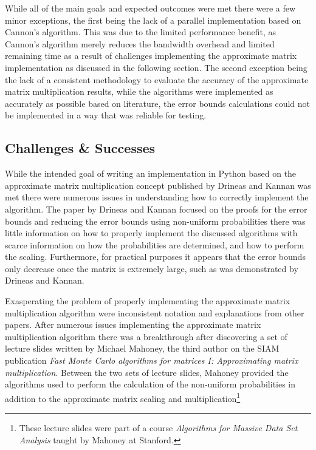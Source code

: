 \documentclass[oneside]{article}
\begin{document}
While all of the main goals and expected outcomes were met there were a few minor exceptions, the first being the lack of a parallel implementation based on Cannon's algorithm. This was due to the limited performance benefit, as Cannon's algorithm merely reduces the bandwidth overhead\cite{lee1997generalized} and limited remaining time as a result of challenges implementing the approximate matrix implementation as discussed in the following section. The second exception being the lack of a consistent methodology to evaluate the accuracy of the approximate matrix multiplication results, while the algorithms were implemented as accurately as possible based on literature, the error bounds calculations could not be implemented in a way that was reliable for testing.




\subsection{Challenges \& Successes}


While the intended goal of writing an implementation in Python based on the approximate matrix multiplication concept published by Drineas and Kannan was met there were numerous issues in understanding how to correctly implement the algorithm. The paper by Drineas and Kannan focused on the proofs for the error bounds and reducing the error bounds using non-uniform probabilities there was little information on how to properly implement the discussed algorithms with scarce information on how the probabilities are determined, and how to perform the scaling. Furthermore, for practical purposes it appears that the error bounds only decrease once the matrix is extremely large, such as was demonstrated by Drineas and Kannan\cite{drineas2001fast}.

Exasperating the problem of properly implementing the approximate matrix multiplication algorithm were inconsistent notation and explanations from other papers. After numerous issues implementing the approximate matrix multiplication algorithm there was a breakthrough after discovering a set of lecture slides written by Michael Mahoney, the third author on the SIAM publication \emph{Fast Monte Carlo algorithms for matrices I: Approximating matrix multiplication}\cite{drineas2006fastI}. Between the two sets of lecture slides\cite{mahoneyCS369M, mahoneyCS294}, Mahoney provided the algorithms used to perform the calculation of the non-uniform probabilities in addition to the approximate matrix scaling and multiplication\footnote{These lecture slides were part of a course \emph{Algorithms for Massive Data Set Analysis} taught by Mahoney at Stanford.}
\end{document}
